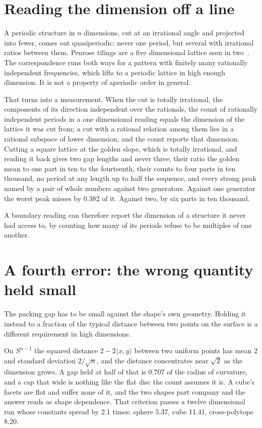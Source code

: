 \section{Reading the dimension off a line}

A periodic structure in $n$ dimensions, cut at an irrational angle and projected into fewer, comes
out quasiperiodic: never one period, but several with irrational ratios between them. Penrose
tilings are a five dimensional lattice seen in two~\cite{src:de-Bruijn-1981}. The correspondence runs both ways for a pattern
with finitely many rationally independent frequencies, which lifts to a periodic lattice in high
enough dimension. It is not a property of aperiodic order in general.

That turns into a measurement. When the cut is totally irrational, the components of its direction
independent over the rationals, the count of rationally independent periods in a one dimensional
reading equals the dimension of the lattice it was cut from; a cut with a rational relation among
them lies in a rational subspace of lower dimension, and the count reports that dimension. Cutting
a square lattice at the golden slope, which is totally irrational, and reading it back gives two
gap lengths and never three, their ratio the golden mean to one part in ten to the fourteenth, their
counts to four parts in ten thousand, no period at any length up to half the sequence, and every
strong peak named by a pair of whole numbers against two generators. Against one generator the
worst peak misses by 0.382 of it. Against two, by six parts in ten thousand.

A boundary reading can therefore report the dimension of a structure it never had access to, by counting
how many of its periods refuse to be multiples of one another.

\section{A fourth error: the wrong quantity held small}

The packing gap has to be small against the shape's own geometry. Holding it instead to a fraction
of the typical distance between two points on the surface is a different requirement in high
dimensions.

On $S^{n-1}$ the squared distance $2 - 2\langle x, y\rangle$ between two uniform points has mean $2$
and standard deviation $2/\sqrt{n}$, and the distance concentrates near $\sqrt{2}$ as the dimension
grows. A gap held at half of that is $0.707$ of the radius of curvature, and a cap that wide is
nothing like the flat disc the count assumes it is. A cube's facets are flat and suffer none of it,
and the two shapes part company and the answer reads as shape dependence. That criterion passes a
twelve dimensional run whose constants spread by 2.1 times: sphere 5.37, cube 11.41, cross-polytope
8.20.

